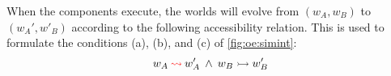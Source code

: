 When the components execute,
the worlds will evolve
from $(w_A, w_B)$ to $(w_A', w'_B)$
according to
the following accessibility relation.
This is used to formulate the conditions (a), (b), and (c) of \autoref{fig:oe:simint}:
\[
  w_A \mathbin{\textcolor{red}{\leadsto}} w_A' \:\wedge\: w_B \rightarrowtail w_B'
\]

